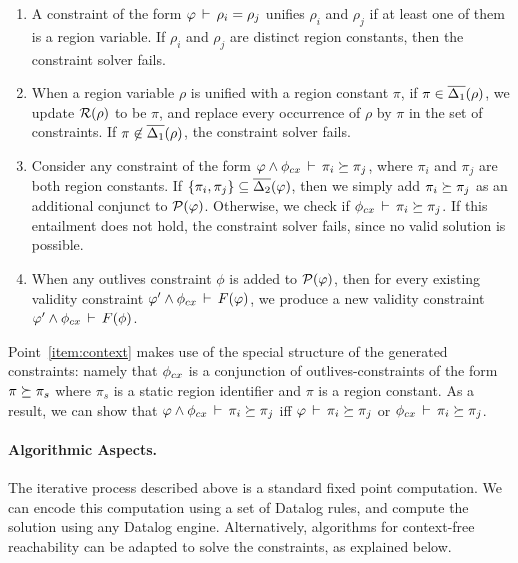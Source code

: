 \begin{enumerate}

\item
    A constraint of the form $\varphi\,\vdash\,\rho_i = \rho_j$ unifies
$\rho_i$ and $\rho_j$ if at least one of them is a region variable.
If $\rho_i$ and $\rho_j$ are distinct region constants, then the constraint
solver fails.

\item
When a region variable $\rho$ is unified with a region constant $\pi$,
if $\pi \in \overline{\Delta_1}(\rho)$, we update $\mathcal{R}(\rho)$ to be $\pi$,
and replace every occurrence of $\rho$ by $\pi$ in the set of constraints.
If $\pi \not\in \overline{\Delta_1}(\rho)$, the constraint solver fails.

\item
\label{item:context}
Consider any constraint of the form $\varphi \wedge \phi_{cx}\,\vdash\,\pi_i \succeq \pi_j$,
where $\pi_i$ and $\pi_j$ are both region constants.
If $\{ \pi_i, \pi_j \} \subseteq \overline{\Delta_2}(\varphi)$, then we simply add
$\pi_i \succeq \pi_j$ as an additional conjunct to $\mathcal{P}(\varphi)$.
Otherwise, we check if $\phi_{cx}\,\vdash\,\pi_i \succeq \pi_j$.
If this entailment does not hold, the constraint solver fails, since no valid solution is possible.

\item
  When any outlives constraint $\phi$ is added to $\mathcal{P}(\varphi)$,
  then for every existing validity constraint $\varphi' \wedge \phi_{cx}\,\vdash\,F(\varphi)$,
  we produce a new validity constraint $\varphi' \wedge \phi_{cx}\,\vdash\,F(\phi)$. 
\end{enumerate}

Point~\ref{item:context} makes use of the special structure of the generated
constraints: namely that $\phi_{cx}$  is a conjunction of outlives-constraints of the
form $\pi \succeq \pi_s$ where $\pi_s$ is a static region identifier and $\pi$ is a
region constant. As a result, we can show that $\varphi \wedge \phi_{cx}\,\vdash\,\pi_i \succeq \pi_j$
iff $\varphi\,\vdash\,\pi_i \succeq \pi_j$ or $\phi_{cx}\,\vdash\,\pi_i \succeq \pi_j$.

\paragraph{Algorithmic Aspects.}
The iterative process described above is a standard fixed point computation.
We can encode this computation using a set of Datalog rules,
and compute the solution using any Datalog engine.
Alternatively, algorithms for context-free reachability can be adapted
to solve the constraints, as explained below.

